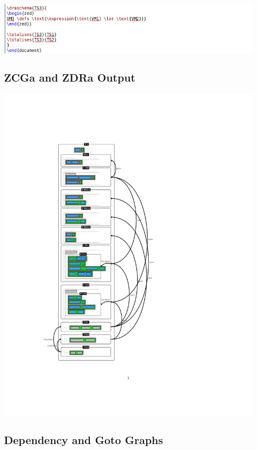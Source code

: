 \noindent \includegraphics[scale=0.5]{examples/vm/1n2imagec.png}


%
\subsection{ZCGa and ZDRa Output}
\label{app:vm1n2o}
\includegraphics[clip, trim=3cm 4cm 6cm 4.2cm]{examples/vm/1n2comp.pdf}
%
\subsection{Dependency and Goto Graphs}
\label{app:vm2.5}

